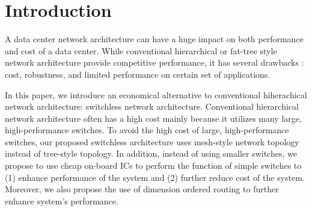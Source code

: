 \section{Introduction}
\label{sec:intro}
A data center network architecture can have a huge impact on both performance and cost of a data center. While conventional hierarchical or fat-tree style network architecture provide competitive performance, it has several drawbacks : cost, robustness, and limited performance on certain set of applications. 

In this paper, we introduce an economical alternative to conventional hiherachical network architecture: switchless network architecture. Conventional hierarchical network architecture often has a high cost mainly because it utilizes many large, high-performance switches. To avoid the high cost of large, high-performance switches, our proposed switchless architecture uses mesh-style network topology instead of tree-style topology. In addition, instead of using smaller switches, we propose to use cheap on-board ICs to perform the function of simple switches to (1) enhance performance of the system and (2) further reduce cost of the system. Moreover, we also propose the use of dimension ordered routing to further enhance system's performance.